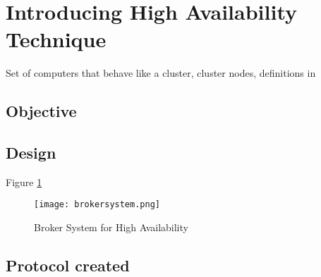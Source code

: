 \section{Introducing High Availability Technique}
\label{sec:ha_broker}
Set of computers that behave like a cluster, cluster nodes, definitions in \cite{barreradesign}


\subsection{Objective}
\subsection{Design}
Figure \ref{fig:brokersystem}


\begin{figure}[h]
	\centering
	\texttt{[image: brokersystem.png]}
	\caption{Broker System for High Availability}
	\label{fig:brokersystem}
	
\end{figure}

\subsection{Protocol created}
\cite{protobuf}